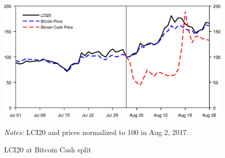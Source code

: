 \documentclass[11pt]{article}
\newcommand\fnotes[1]{\captionsetup{font=scriptsize}\caption*{\textsl{Notes:} #1}}
\begin{document}
\begin{figure}%
    \centering%
    \includegraphics[width=\textwidth]{figs/lci20_bch_split.eps}%
    \caption{LCI20 at Bitcoin Cash split}\label{f:split}%
    \fnotes{LCI20 and prices normalized to 100 in Aug 2, 2017.}
\end{figure}





\end{document}
